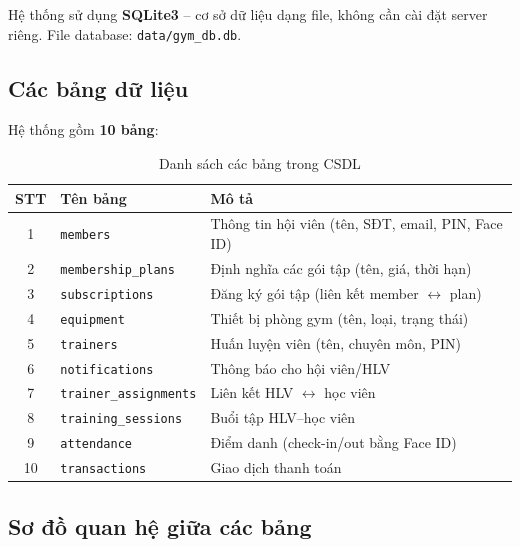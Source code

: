 \documentclass[12pt,a4paper]{article}
\begin{document}
Hệ thống sử dụng \textbf{SQLite3} -- cơ sở dữ liệu dạng file, không cần cài đặt server riêng. File database: \texttt{data/gym\_db.db}.

\subsection{Các bảng dữ liệu}

Hệ thống gồm \textbf{10 bảng}:

\begin{table}[H]
	\centering
	\caption{Danh sách các bảng trong CSDL}
	\begin{tabularx}{\textwidth}{|c|l|X|}
		\hline
		\textbf{STT} & \textbf{Tên bảng}             & \textbf{Mô tả}                                           \\
		\hline
		1            & \texttt{members}              & Thông tin hội viên (tên, SĐT, email, PIN, Face ID)       \\
		\hline
		2            & \texttt{membership\_plans}    & Định nghĩa các gói tập (tên, giá, thời hạn)              \\
		\hline
		3            & \texttt{subscriptions}        & Đăng ký gói tập (liên kết member $\leftrightarrow$ plan) \\
		\hline
		4            & \texttt{equipment}            & Thiết bị phòng gym (tên, loại, trạng thái)               \\
		\hline
		5            & \texttt{trainers}             & Huấn luyện viên (tên, chuyên môn, PIN)                   \\
		\hline
		6            & \texttt{notifications}        & Thông báo cho hội viên/HLV                               \\
		\hline
		7            & \texttt{trainer\_assignments} & Liên kết HLV $\leftrightarrow$ học viên                  \\
		\hline
		8            & \texttt{training\_sessions}   & Buổi tập HLV--học viên                                   \\
		\hline
		9            & \texttt{attendance}           & Điểm danh (check-in/out bằng Face ID)                    \\
		\hline
		10           & \texttt{transactions}         & Giao dịch thanh toán                                     \\
		\hline
	\end{tabularx}
\end{table}

\subsection{Sơ đồ quan hệ giữa các bảng}
\end{document}
